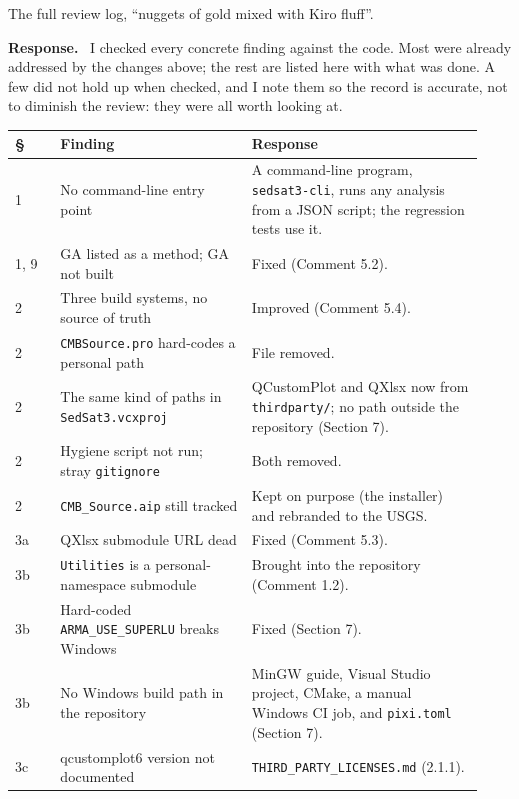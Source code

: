 \documentclass[11pt]{article}
\newcommand{\code}[1]{\texttt{#1}}
\newcounter{cmt}
\newcounter{grp}
\renewcommand{\thecmt}{\thegrp.\arabic{cmt}}
\newenvironment{reviewer}[1]{%
  \refstepcounter{cmt}%
  \begin{tcolorbox}[enhanced,breakable,colback=commentbg,colframe=usgsgreen!60,
    boxrule=0.4pt,left=6pt,right=6pt,top=4pt,bottom=4pt,
    title={\small\textbf{Comment \thecmt}\hfill\textit{#1}},
    coltitle=black,colbacktitle=usgsgreen!15,fonttitle=\small]}%
  {\end{tcolorbox}}
\newenvironment{response}{\par\noindent\textbf{Response.}\ }{\par\medskip}
\begin{document}
\begin{reviewer}{Observations, \S1--16}
The full review log, ``nuggets of gold mixed with Kiro fluff''.
\end{reviewer}
\begin{response}
I checked every concrete finding against the code. Most were already
addressed by the changes above; the rest are listed here with what was
done. A few did not hold up when checked, and I note them so the record is
accurate, not to diminish the review: they were all worth looking at.
\end{response}

{\small
\begin{longtable}{@{}p{0.09\linewidth}p{0.38\linewidth}p{0.46\linewidth}@{}}
\toprule
\S & Finding & Response\\
\midrule
\endhead
1 & No command-line entry point & A command-line program, \code{sedsat3-cli}, runs any analysis from a JSON script; the regression tests use it.\\
1, 9 & GA listed as a method; GA not built & Fixed (Comment 5.2).\\
2 & Three build systems, no source of truth & Improved (Comment 5.4).\\
2 & \code{CMBSource.\allowbreak{}pro} hard-codes a personal path & File removed.\\
2 & The same kind of paths in \code{SedSat3.\allowbreak{}vcxproj} & QCustomPlot and QXlsx now from \code{thirdparty/\allowbreak{}}; no path outside the repository (Section 7).\\
2 & Hygiene script not run; stray \code{gitignore} & Both removed.\\
2 & \code{CMB\_\allowbreak{}Source.\allowbreak{}aip} still tracked & Kept on purpose (the installer) and rebranded to the USGS.\\
3a & QXlsx submodule URL dead & Fixed (Comment 5.3).\\
3b & \code{Utilities} is a personal-namespace submodule & Brought into the repository (Comment 1.2).\\
3b & Hard-coded \code{ARMA\_\allowbreak{}USE\_\allowbreak{}SUPERLU} breaks Windows & Fixed (Section 7).\\
3b & No Windows build path in the repository & MinGW guide, Visual Studio project, CMake, a manual Windows CI job, and \code{pixi.toml} (Section 7).\\
3c & qcustomplot6 version not documented & \code{THIRD\_\allowbreak{}PARTY\_\allowbreak{}LICENSES.\allowbreak{}md} (2.1.1).\\

\end{longtable}}
\end{document}
